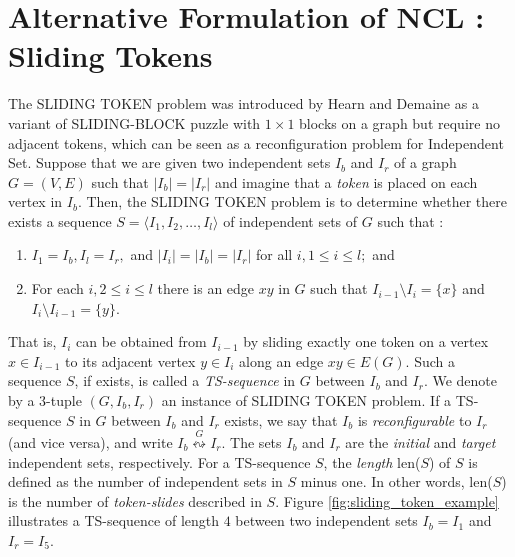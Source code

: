 \section{Alternative Formulation of NCL : Sliding Tokens} \label{sec:sliding_tokens}
The SLIDING TOKEN problem was introduced by Hearn and Demaine \cite{hearn_pspace-completeness_2004} as a variant of SLIDING-BLOCK puzzle
with $1 \times 1 $ blocks on a graph but require no adjacent tokens, which can be seen as a reconfiguration problem for Independent Set.
Suppose that we are given two independent sets $I_b$ and $I_r$ of a graph $G =(V,E)$ such that $|I_b| = |I_r|$ and imagine that a \textit{token}
is placed on each vertex in $I_b$. Then, the SLIDING TOKEN problem is to determine whether there exists a sequence
$ S = \langle I_1, I_2, \dots, I_l \rangle$ of independent sets of $G$ such that :
\begin{enumerate}
  \item $I_1 = I_b, I_l = I_r,$ and $|I_i| = |I_b| = |I_r|$ for all $i, 1 \leq i \leq l;$ and
  \item For each $i, 2 \leq i \leq l$ there is an edge $xy$ in $G$ such that  $I_{i-1} \setminus I_{i} = \{x\}$ and $I_{i} \setminus I_{i-1} = \{y\}$.
\end{enumerate}
That is, $I_i$ can be obtained from $I_{i-1}$ by sliding exactly one token on a vertex $x \in I_{i-1}$ to its adjacent vertex $y \in I_{i}$
along an edge $xy \in E(G)$. Such a sequence $S$, if exists, is called a \textit{TS-sequence} in $G$ between $I_b$ and $I_r$.
We denote by a $3$-tuple $(G, I_{b}, I_{r})$ an instance of SLIDING TOKEN problem.  If a TS-sequence $S$ in $G$ between $I_{b}$ and $I_{r}$ exists,
we say that $I_{b}$ is \textit{reconfigurable} to $I_{r}$ (and vice versa), and write $I_{b} \overset{G}\leftrightsquigarrow I_{r}$. The sets
$I_{b}$ and $I_{r}$ are the \textit{initial} and \textit{target} independent sets, respectively. For a TS-sequence $S$, the \textit{length} len($S$)
of $S$ is defined as the number of independent sets in $S$ minus one. In other words, len($S$) is the number of \textit{token-slides} described in
$S$. Figure \ref{fig:sliding_token_example} illustrates a TS-sequence of length $4$ between two independent sets $I_{b} = I_{1}$ and $I_{r} = I_{5}$.

